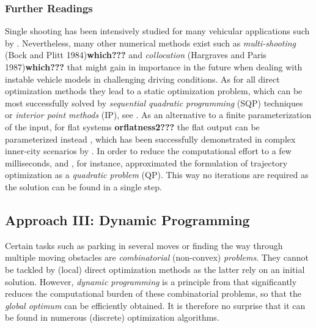 \subsubsection{Further Readings}\label{S:57.3.2.3}

Single shooting has been intensively studied for many vehicular applications such by \cite{kelly2003reactive,Falcone2007,howard2007optimal,Yoon2009,gerdts2009generating, park2009obstacle}.%
Nevertheless, many other numerical methods exist such as \emph{multi-shooting} (Bock and Plitt 1984)\textbf{which???} and \emph{collocation} (Hargraves and Paris 1987)\textbf{which???} that might gain in importance in the future when dealing with instable vehicle models in challenging driving conditions. 
As for all direct optimization methods they lead to a static optimization problem, which can be most successfully solved by \emph{sequential quadratic programming} (SQP) techniques or \emph{interior point methods} (IP), see \cite{nocedal2006numerical}.%
As an alternative to a finite parameterization of the input, for flat systems \cite{rouchon1993flatness1}\textbf{orflatness2???}%
the flat output can be parameterized instead \cite{kang2012online},%
 which has been successfully demonstrated in complex inner-city scenarios by \cite{ziegler2014trajectory}. %
In order to reduce the computational effort to a few milliseconds, \cite{Falcone2007}%
 and \cite{carvalho2013predictive},%
for instance, approximated the formulation of trajectory optimization as a \emph{quadratic problem} (QP). This way no iterations are required as the solution can be found in a single step.

\subsection{Approach III: Dynamic Programming}\label{S:57.3.3}
Certain tasks such as parking in several moves or finding the way through multiple moving obstacles are \emph{combinatorial} (non-convex) \emph{problems}. They cannot be tackled by (local) direct optimization methods as the latter rely on an initial solution. However, \emph{dynamic programming} is a principle from \cite{bellmann_DP} %
that significantly reduces the computational burden of these combinatorial problems, so that the \emph{global optimum} can be efficiently obtained. It is therefore no surprise that it can be found in numerous (discrete) optimization algorithms.


